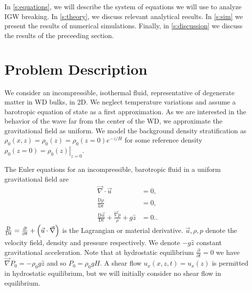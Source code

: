 \documentclass[twocolumn,
        nofootinbib, %
        usenames, %
        aps,
        prd,
        dvipsnames %
    ]{revtex4-1}%
\newcommand*{\pd}[2]{\frac{\partial#1}{\partial#2}}
\newcommand*{\md}[2]{\frac{\mathrm{D}#1}{\mathrm{D}#2}}
\newcommand*{\at}[1]{\left.#1\right|}
\DeclarePairedDelimiter\p{\lparen}{\rparen}
\begin{document}

In \autoref{s:equations}, we will describe the system of equations we will
use to analyze IGW breaking. In \autoref{s:theory}, we discuss relevant
analytical results. In \autoref{s:sim} we present the results of numerical
simulations. Finally, in \autoref{s:discussion} we discuss the results of the
preceeding section.

\section{Problem Description}\label{s:equations}

We consider an incompressible, isothermal fluid, representative of degenerate
matter in WD bulks, in 2D. We neglect temperature variations and assume a
barotropic equation of state as a first approximation. As we are interested in
the behavior of the wave far from the center of the WD, we approximate the
gravitational field as uniform. We model the background density stratification
as $\rho_0(x, z) = \rho_0(z) = \rho_0(z=0) e^{-z/H}$ for some reference density
$\rho_0(z=0) = \at{\rho_0(z)}_{z = 0}$.

The Euler equations for an incompressible, barotropic fluid in a uniform
gravitational field are
\begin{subequations}\label{se:nl_orig}
    \begin{align}
        \vec{\nabla} \cdot \vec{u} &= 0,\\
        \md{\rho}{t} &= 0 ,\label{eq:nl_density}\\
        \md{\vec{u}}{t} + \frac{\vec{\nabla}p}{\rho} + g\hat{z} &=
            0.\label{eq:nl_mom}.
    \end{align}
\end{subequations}
$\md{}{t} = \pd{}{t} + \p*{\vec{u} \cdot \vec{\nabla}}$ is the Lagrangian or
material derivative. $\vec{u}, \rho, p$ denote the velocity field, density and
pressure respectively. We denote $-g\hat{z}$ constant gravitational
acceleration. Note that at hydrostatic equilibrium $\pd{}{t} = 0$ we have
$\vec{\nabla}P_0 = -\rho_0 g\hat{z}$ and so $P_0 = \rho_0 gH$. A shear flow
$u_x(x, z, t) = u_x(z)$ is permitted in hydrostatic equilibrium, but we will
initially consider no shear flow in equilibrium.
\end{document}
